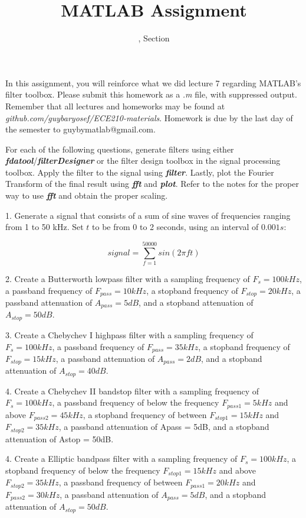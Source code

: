 \documentclass[11pt]{article}
\title{MATLAB Assignment \Homework}
\author{\Session, Section \Section}
\date{}
\makeatletter
\def\MyEmail{guybymatlab@gmail.com}
\makeatother
\begin{document}
\maketitle
In this assignment, you will reinforce what we did lecture 7
regarding MATLAB's filter toolbox.
Please submit this homework as a \textit{.m} file, 
with suppressed output.
Remember that all lectures and homeworks may be found at 
\textit{github.com/guybaryosef/ECE210-materials}.
Homework is due by the last day of the semester to \MyEmail.

For each of the following questions,
generate filters using either \textbf{\textit{fdatool}}/\textbf{\textit{filterDesigner}}
 or the filter design toolbox in the signal processing toolbox.
Apply the filter to the signal using \textit{\textbf{filter}}.
Lastly, plot the Fourier Transform of the final result using \textit{\textbf{fft}} 
and \textit{\textbf{plot}}.
Refer to the notes for the proper way to use \textit{\textbf{fft}} and obtain the proper scaling.

1. Generate a signal that consists of a sum of sine waves of frequencies ranging from 1 to 50 kHz.
Set $t$ to be from 0 to 2 seconds, using an interval of $0.001s$:

$$ signal = \sum_{f=1}^{50000} sin(2\pi ft)$$

2. Create a Butterworth lowpass filter with a sampling frequency of $F_s = 100 kHz$,
a passband frequency of $F_{pass} = 10 kHz$, a stopband frequency of $F_{stop} = 20 kHz$,
a passband attenuation of $A_{pass} = 5dB$, and a stopband attenuation of $A_{stop} = 50dB$.

3. Create a Chebychev I highpass filter with a sampling frequency of $F_s = 100 kHz$,
a passband frequency of $F_{pass} = 35 kHz$, a stopband frequency of $F_{stop} = 15 kHz$,
a passband attenuation of $A_{pass} = 2dB$, and a stopband attenuation of $A_{stop} = 40dB$.

4. Create a Chebychev II bandstop filter with a sampling frequency of $F_s = 100 kHz$,
a passband frequency of below the frequency $F_{pass1} = 5 kHz$ and above $F_{pass2} = 45 kHz$,
a stopband frequency of between $F_{stop1} = 15 kHz$ and $F_{stop2} = 35kHz$,
a passband attenuation of Apass = 5dB, and a stopband attenuation of Astop = 50dB.

4. Create a Elliptic bandpass filter with a sampling frequency of $F_s = 100 kHz$,
a stopband frequency of below the frequency $F_{stop1} = 15 kHz$ and above $F_{stop2} = 35 kHz$,
a passband frequency of between $F_{pass1} = 20 kHz$ and $F_{pass2} = 30 kHz$,
a passband attenuation of $A_{pass} = 5dB$, and a stopband attenuation of $A_{stop} = 50dB$.
\end{document}
